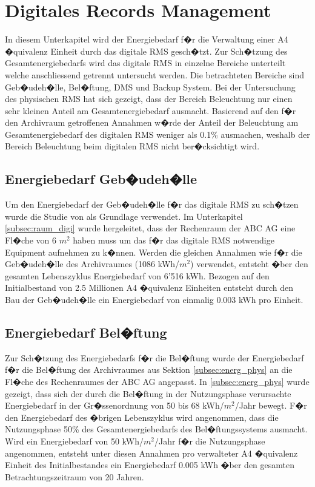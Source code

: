 \documentclass[a4paper,twoside,10pt]{report}
\begin{document}
\section{Digitales Records Management}\label{subsec:energ_digi}
In diesem Unterkapitel wird der Energiebedarf f�r die Verwaltung einer A4 �quivalenz Einheit durch das digitale \acf{RMS} gesch�tzt. Zur Sch�tzung des Gesamtenergiebedarfs wird das digitale \ac{RMS} in einzelne Bereiche unterteilt welche anschliessend getrennt untersucht werden. Die betrachteten Bereiche sind Geb�udeh�lle, Bel�ftung, DMS und Backup System. Bei der Untersuchung des physischen \ac{RMS} hat sich gezeigt, dass der Bereich Beleuchtung nur einen sehr kleinen Anteil am Gesamtenergiebedarf ausmacht. Basierend auf den f�r den Archivraum getroffenen Annahmen w�rde der Anteil der Beleuchtung am Gesamtenergiebedarf des digitalen \ac{RMS} weniger als 0.1\% ausmachen, weshalb der Bereich Beleuchtung beim digitalen \ac{RMS} nicht ber�cksichtigt wird.

\subsection{Energiebedarf Geb�udeh�lle}
Um den Energiebedarf der Geb�udeh�lle f�r das digitale \ac{RMS} zu sch�tzen wurde die Studie von \citeauthor{lca_build} als Grundlage verwendet. Im Unterkapitel \ref{subsec:raum_digi} wurde hergeleitet, dass der Rechenraum der ABC AG eine Fl�che von 6 $m^2$ haben muss um das f�r das digitale \ac{RMS} notwendige Equipment aufnehmen zu k�nnen. Werden die gleichen Annahmen wie f�r die Geb�udeh�lle des Archivraumes (1086 kWh/$m^2$) verwendet, entsteht �ber den gesamten Lebenszyklus Energiebedarf von 6'516 kWh. Bezogen auf den Initialbestand von 2.5 Millionen A4 �quivalenz Einheiten entsteht durch den Bau der Geb�udeh�lle ein Energiebedarf von einmalig 0.003 kWh pro Einheit.

\subsection{Energiebedarf Bel�ftung}
Zur Sch�tzung des Energiebedarfs f�r die Bel�ftung wurde der Energiebedarf f�r die Bel�ftung des Archivraumes aus Sektion \ref{subsec:energ_phys} an die Fl�che des Rechenraumes der ABC AG angepasst. In \ref{subsec:energ_phys} wurde gezeigt, dass sich der durch die Bel�ftung in der Nutzungsphase verursachte Energiebedarf in der Gr�ssenordnung von 50 bis 68 kWh/$m^2$/Jahr bewegt. F�r den Energiebedarf des �brigen Lebenszyklus wird angenommen, dass die Nutzungsphase 50\% des Gesamtenergiebedarfs des Bel�ftungssystems ausmacht. Wird ein Energiebedarf von 50 kWh/$m^2$/Jahr f�r die Nutzungsphase angenommen, entsteht unter diesen Annahmen pro verwalteter A4 �quivalenz Einheit des Initialbestandes ein Energiebedarf 0.005 kWh �ber den gesamten Betrachtungszeitraum von 20 Jahren. 
\end{document}
